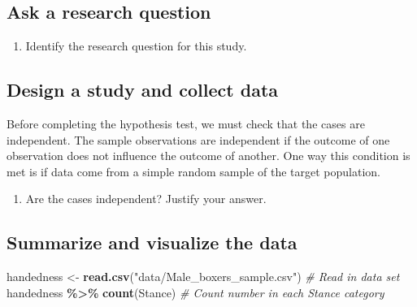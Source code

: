 \documentclass[
]{report}
\newenvironment{Shaded}{\begin{snugshade}}{\end{snugshade}}
\newcommand{\CommentTok}[1]{\textcolor[rgb]{0.56,0.35,0.01}{\textit{#1}}}
\newcommand{\KeywordTok}[1]{\textcolor[rgb]{0.13,0.29,0.53}{\textbf{#1}}}
\newcommand{\NormalTok}[1]{#1}
\newcommand{\OperatorTok}[1]{\textcolor[rgb]{0.81,0.36,0.00}{\textbf{#1}}}
\newcommand{\StringTok}[1]{\textcolor[rgb]{0.31,0.60,0.02}{#1}}
\providecommand{\tightlist}{%
  \setlength{\itemsep}{0pt}\setlength{\parskip}{0pt}}
\begin{document}
\vspace{0.5in}

\hypertarget{ask-a-research-question}{%
\subsection*{Ask a research question}\label{ask-a-research-question}}

\begin{enumerate}
\def\labelenumi{\arabic{enumi}.}
\setcounter{enumi}{4}
\tightlist
\item
  Identify the research question for this study.
\end{enumerate}

\vspace{1in}

\hypertarget{design-a-study-and-collect-data}{%
\subsection*{Design a study and collect data}\label{design-a-study-and-collect-data}}

Before completing the hypothesis test, we must check that the cases are independent. The sample observations are independent if the outcome of one observation does not influence the outcome of another. One way this condition is met is if data come from a simple random sample of the target population.

\begin{enumerate}
\def\labelenumi{\arabic{enumi}.}
\setcounter{enumi}{5}
\tightlist
\item
  Are the cases independent? Justify your answer.
\end{enumerate}

\vspace{1in}

\hypertarget{summarize-and-visualize-the-data}{%
\subsection*{Summarize and visualize the data}\label{summarize-and-visualize-the-data}}

\begin{Shaded}
\begin{Highlighting}[]
\NormalTok{handedness \textless{}{-}}\StringTok{ }\KeywordTok{read.csv}\NormalTok{(}\StringTok{"data/Male\_boxers\_sample.csv"}\NormalTok{) }\CommentTok{\# Read in data set}
\NormalTok{handedness }\OperatorTok{\%\textgreater{}\%}\StringTok{ }\KeywordTok{count}\NormalTok{(Stance)  }\CommentTok{\# Count number in each Stance category}
\end{Highlighting}
\end{Shaded}
\end{document}
